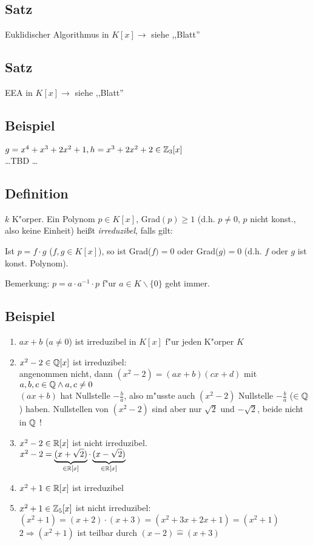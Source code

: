 
\subsection{Satz} Euklidischer Algorithmus in $K[x] \rightarrow$ siehe ,,Blatt''

\subsection{Satz} EEA in $K[x] \rightarrow$ siehe ,,Blatt''

\subsection{Beispiel}
$g=x^4+x^3 + 2x^2+1,  h= x^3+2x^2+2 \in \mathbb{Z}_3 [x]$\\
\dots TBD \dots

\subsection{Definition}
$k$ K"orper. Ein Polynom $p\in K[x]$, Grad$(p)\geq 1$ (d.h. $p\neq 0$, $p$ nicht konst., also keine Einheit) heißt \emph{irreduzibel}, falls gilt: 

Ist $p=f \cdot g$ ($f,g\in K[x]$), so ist Grad($f)= 0$ oder Grad($g)=0$ (d.h. $f$ oder $g$ ist konst. Polynom).

Bemerkung: $p= a \cdot a^{-1} \cdot p$ f"ur $a \in K \backslash \{0\}$ geht immer.

\subsection{Beispiel}
\begin{enumerate}
	\item
	$ax+b$ ($a \neq 0$) ist irreduzibel in $K[x]$ f"ur jeden K"orper $K$
	\item
	$x^2-2 \in \mathbb{Q}[x]$ ist irreduzibel:\\
	angenommen nicht, dann $(x^2-2) = (ax+b)(cx+d)$ mit $a,b,c \in \mathbb{Q} \land a,c \neq 0$\\
	$(ax+b)$ hat Nullstelle $-\frac{b}{a}$, also m"usste auch $(x^2-2)$ Nullstelle $-\frac{b}{a}$ ($\in \mathbb{Q}$) haben.
	Nullstellen von $(x^2-2)$ sind aber nur $\sqrt{2}$ und $-\sqrt{2}$, beide nicht in $\mathbb{Q}$ !
	\item
	$x^2-2 \in \mathbb{R}[x]$ ist nicht irreduzibel.\\
	$x^2-2 = \underbrace{(x+ \sqrt{2})}_{\in \mathbb{R}[x]} \cdot \underbrace{(x-\sqrt{2})}_{\in \mathbb{R}[x]}$
	\item
	$x^2+1 \in \mathbb{R}[x]$ ist irreduzibel
	\item
	$x^2+1 \in \mathbb{Z}_5[x]$ ist nicht irreduzibel:\\
	$(x^2 +1) = (x+2) \cdot (x+3) = (x^2 + 3x +2x +1) = (x^2+1)$\\
	$2 \Rightarrow (x^2+1)$ ist teilbar durch $(x-2) \hat{=} (x+3)$
\end{enumerate}

